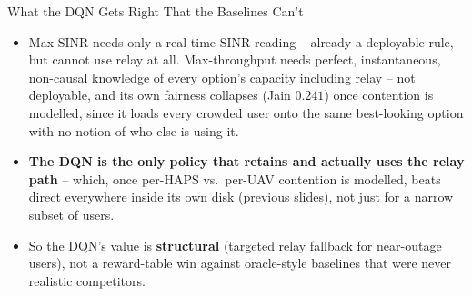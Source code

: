 \documentclass[aspectratio=169]{beamer}
\begin{document}
\begin{frame}{What the DQN Gets Right That the Baselines Can't}
\footnotesize
\begin{itemize}\setlength{\itemsep}{4pt}
  \item Max-SINR needs only a real-time SINR reading -- already a
        deployable rule, but cannot use relay at all. Max-throughput
        needs perfect, instantaneous, non-causal knowledge of every
        option's capacity including relay -- not deployable, and its
        own fairness collapses (Jain $0.241$) once contention is
        modelled, since it loads every crowded user onto the same
        best-looking option with no notion of who else is using it.
  \item \textbf{The DQN is the only policy that retains and actually
        uses the relay path} -- which, once per-HAPS vs.\ per-UAV
        contention is modelled, beats direct everywhere inside its own
        disk (previous slides), not just for a narrow subset of users.
  \item So the DQN's value is \textbf{structural} (targeted relay
        fallback for near-outage users), not a reward-table win against
        oracle-style baselines that were never realistic competitors.
\end{itemize}
\end{frame}
\end{document}
